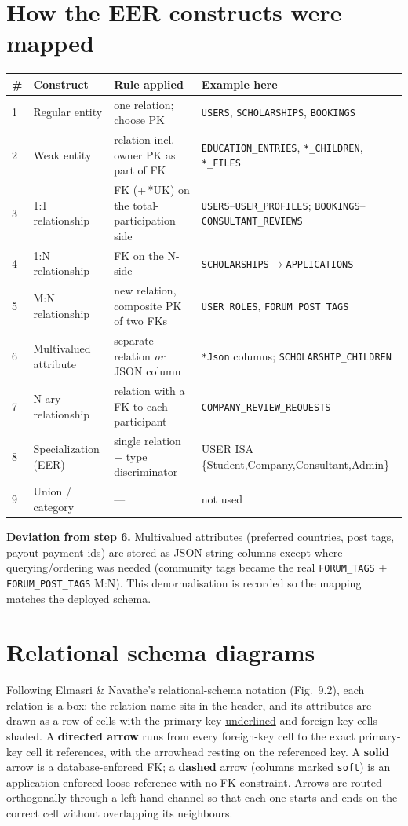 \documentclass[11pt,a4paper]{article}
\begin{document}
\section{How the EER constructs were mapped}
\begin{longtable}{@{}p{0.5cm}p{3.2cm}p{6.0cm}p{4.7cm}@{}}
\toprule
\textbf{\#} & \textbf{Construct} & \textbf{Rule applied} & \textbf{Example here}\\
\midrule\endhead
1 & Regular entity & one relation; choose PK & \texttt{USERS}, \texttt{SCHOLARSHIPS}, \texttt{BOOKINGS}\\
2 & Weak entity & relation incl. owner PK as part of FK & \texttt{EDUCATION\_ENTRIES}, \texttt{*\_CHILDREN}, \texttt{*\_FILES}\\
3 & 1:1 relationship & FK (+\,*UK) on the total-participation side & \texttt{USERS}--\texttt{USER\_PROFILES}; \texttt{BOOKINGS}--\texttt{CONSULTANT\_REVIEWS}\\
4 & 1:N relationship & FK on the N-side & \texttt{SCHOLARSHIPS}$\rightarrow$\texttt{APPLICATIONS}\\
5 & M:N relationship & new relation, composite PK of two FKs & \texttt{USER\_ROLES}, \texttt{FORUM\_POST\_TAGS}\\
6 & Multivalued attribute & separate relation \emph{or} JSON column & \texttt{*Json} columns; \texttt{SCHOLARSHIP\_CHILDREN}\\
7 & N-ary relationship & relation with a FK to each participant & \texttt{COMPANY\_REVIEW\_REQUESTS}\\
8 & Specialization (EER) & single relation + type discriminator & USER ISA \{Student,Company,Consultant,Admin\}\\
9 & Union / category & --- & not used\\
\bottomrule
\end{longtable}
\noindent\textbf{Deviation from step 6.} Multivalued attributes (preferred
countries, post tags, payout payment-ids) are stored as JSON string columns
except where querying/ordering was needed (community tags became the real
\texttt{FORUM\_TAGS} + \texttt{FORUM\_POST\_TAGS} M:N). This denormalisation is
recorded so the mapping matches the deployed schema.

\section{Relational schema diagrams}
Following Elmasri \& Navathe's relational-schema notation (Fig.~9.2), each
relation is a box: the relation name sits in the header, and its attributes
are drawn as a row of cells with the primary key \underline{underlined} and
foreign-key cells shaded. A \textbf{directed arrow} runs from every
foreign-key cell to the exact primary-key cell it references, with the
arrowhead resting on the referenced key. A \textbf{solid} arrow is a
database-enforced FK; a \textbf{dashed} arrow (columns marked \texttt{soft})
is an application-enforced loose reference with no FK constraint. Arrows are
routed orthogonally through a left-hand channel so that each one starts and
ends on the correct cell without overlapping its neighbours.
\end{document}
